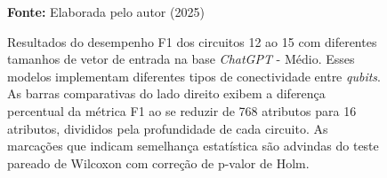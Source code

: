 \begin{figure}
\caption{Resultados do desempenho F1 dos circuitos 12 ao 15 com diferentes tamanhos de vetor de entrada na base \textit{ChatGPT} - Médio. Esses modelos implementam diferentes tipos de conectividade entre \textit{qubits}. As barras comparativas do lado direito exibem a diferença percentual da métrica F1 ao se reduzir de 768 atributos para 16 atributos, divididos pela profundidade de cada circuito. As marcações que indicam semelhança estatística são advindas do teste pareado de Wilcoxon com correção de p-valor de Holm.}
\label{fig:n_features:medium:g3}
     \centering
    \centering
      \par\medskip\ABNTEXfontereduzida\selectfont\textbf{Fonte:} Elaborada pelo autor (2025) \par\medskip
\end{figure}